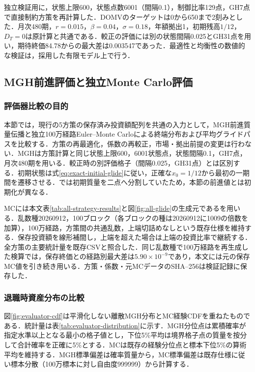\documentclass[10pt,a4paper]{article}
\theoremstyle{plain}
\theoremstyle{definition}
\begin{document}
独立検証用に，状態上限600，状態点数6001（間隔0.1），制御比率129点，GH7点で直接制約方策を再計算した．DOMVのターゲットは0から650まで2刻みとした．月次480期，$r=0.015$，$\beta=0.04$，$\sigma=0.18$，年額拠出1，初期残高$1/12$，$D_T=0$は原計算と共通である．較正の評価には別の状態間隔0.025とGH31点を用い，期待終価84.78からの最大差は0.003547であった．最適性と均衡性の数値的な検証は，採用した有限モデル上で行う．

\subsection{MGH前進評価と独立Monte Carlo評価}\label{app:validation-evaluators}

\subsubsection{評価器比較の目的}

本節では，現行の5方策の保存済み投資額配列を共通の入力として，MGH前進質量伝播と独立100万経路Euler--Monte Carloによる終端分布および平均グライドパスを比較する．方策の再最適化，係数の再較正，市場・拠出前提の変更は行わない．MGHは方策計算と同じ状態上限600，6001状態点，状態間隔0.1，GH7点，月次480期を用いる．較正時の別評価格子（間隔0.025，GH31点）とは区別する．初期状態は式\eqref{eq:exact-initial-glide}に従い，正確な$x_0=1/12$から最初の一期間を遷移させる．では初期質量を二点へ分割していたため，本節の前進値とは初期化が異なる．

MCには本文表\ref{tab:all-strategy-results}と図\ref{fig:all-glide}の生成元であるを用いる．乱数種20260912，100ブロック（各ブロックの種は20260912に1009の倍数を加算），100万経路，方策間の共通乱数，上端切詰めなしという既存仕様を維持する．保存投資額を線形補間し，上端を超えた場合は上端の投資比率で継続する．全方策の主要統計量を既存CSVと照合した．同じ乱数種で100万経路を再生成した検算では，保存終価との経路別最大差は$5.90\times10^{-9}$であり，本文には元の保存MC値を引き続き用いる．方策・係数・元MCデータのSHA--256は検証記録に保存した．

\subsubsection{退職時資産分布の比較}

図\ref{fig:evaluator-cdf}は平滑化しない離散MGH分布とMC経験CDFを重ねたものである．統計量は表\ref{tab:evaluator-distribution}に示す．MGH分位点は累積確率が指定水準以上となる最小の格子値とし，下位5\%平均は境界格子点の質量を按分して合計確率を正確に5\%とする．MCは既存の経験分位点と標本下位5\%の算術平均を維持する．MGH標準偏差は確率質量から，MC標準偏差は既存仕様に従い標本分散（100万標本に対し自由度999999）から計算する．
\end{document}
